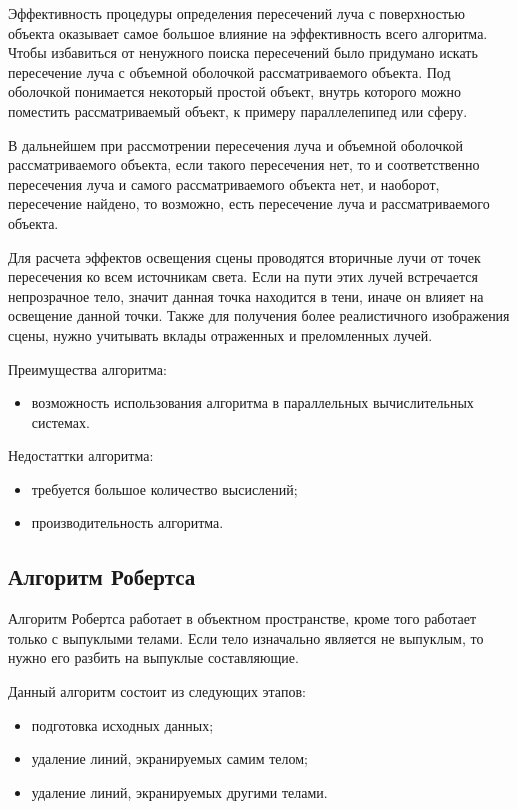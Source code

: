 Эффективность процедуры определения пересечений луча с поверхностью объекта оказывает самое большое влияние на эффективность всего алгоритма. Чтобы избавиться от ненужного поиска пересечений было придумано искать пересечение луча с объемной оболочкой рассматриваемого объекта. Под оболочкой понимается некоторый простой объект, внутрь которого можно поместить рассматриваемый объект, к примеру параллелепипед или сферу. 

В дальнейшем при рассмотрении пересечения луча и объемной оболочкой рассматриваемого объекта, если такого пересечения нет, то и соответственно пересечения луча и самого рассматриваемого объекта нет, и наоборот, пересечение найдено, то возможно, есть пересечение луча и рассматриваемого объекта. 

Для расчета эффектов освещения сцены проводятся вторичные лучи от точек пересечения ко всем источникам света. Если на пути этих лучей встречается непрозрачное тело, значит данная точка находится в тени, иначе он влияет на освещение данной точки. Также для получения более реалистичного изображения сцены, нужно учитывать вклады отраженных и преломленных лучей.

Преимущества алгоритма:
\begin{itemize}
	\item возможность использования алгоритма в параллельных вычислительных системах.
\end{itemize}

Недостаттки алгоритма:
\begin{itemize}
	\item требуется большое количество высислений;
	\item производительность алгоритма.
\end{itemize}

\subsection{Алгоритм Робертса}

Алгоритм Робертса работает в объектном пространстве, кроме того работает только с выпуклыми телами. Если тело изначально является не выпуклым, то нужно его разбить на выпуклые составляющие.

Данный алгоритм состоит из следующих этапов:
\begin{itemize}
	\item подготовка исходных данных;
	\item удаление линий, экранируемых самим телом;
	\item удаление линий, экранируемых другими телами.
\end{itemize}


